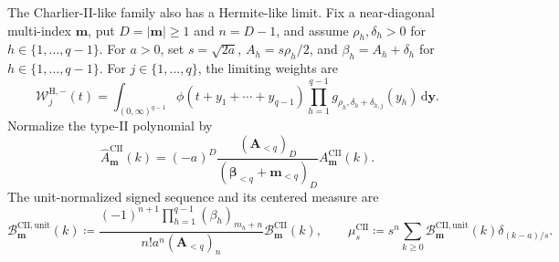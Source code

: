 \documentclass[10pt]{amsart}
\newcommand{\dd}{\,\mathrm d}
\newcommand{\A}{\boldsymbol A}
\newcommand{\bbeta}{\boldsymbol\beta}
\newcommand{\mm}{\boldsymbol m}
\newcommand{\abs}[1]{\lvert#1\rvert}
\theoremstyle{plain}
\theoremstyle{definition}
\theoremstyle{remark}
\begin{document}
The Charlier-II-like family also has a Hermite-like limit.  Fix a
near-diagonal multi-index \(\mm\), put \(D=\abs\mm\ge1\) and
\(n=D-1\), and assume \(\rho_h,\delta_h>0\) for
\(h\in\{1,\ldots,q-1\}\). For \(a>0\), set \(s=\sqrt{2a}\),
\(A_h=s\rho_h/2\), and \(\beta_h=A_h+\delta_h\) for
\(h\in\{1,\ldots,q-1\}\).
For \(j\in\{1,\ldots,q\}\), the limiting weights are
\begin{equation}
 \mathcal W_j^{\mathrm H,-}(t)
 =\int_{(0,\infty)^{q-1}}
 \phi(t+y_1+\cdots+y_{q-1})
 \prod_{h=1}^{q-1}g_{\rho_h,\delta_h+\delta_{h,j}}(y_h)
 \dd\boldsymbol y.
\end{equation}
Normalize the type-II polynomial by
\[
 \widehat A_{\mm}^{\mathrm{CII}}(k)
 =(-a)^D\frac{(\A_{<q})_D}
 {(\bbeta_{<q}+\mm_{<q})_D}A_{\mm}^{\mathrm{CII}}(k).
\]
The unit-normalized signed sequence and its centered measure are
\[
 \mathcal B_{\mm}^{\mathrm{CII,unit}}(k)
 \coloneq
 \frac{(-1)^{n+1}\prod_{h=1}^{q-1}(\beta_h)_{m_h+n}}
 {n!a^n(\A_{<q})_n}
 \mathcal B_{\mm}^{\mathrm{CII}}(k),
 \qquad
 \mu_s^{\mathrm{CII}}
 \coloneq s^n\sum_{k\ge0}\mathcal B_{\mm}^{\mathrm{CII,unit}}(k)
 \delta_{(k-a)/s}.
\]
\end{document}
